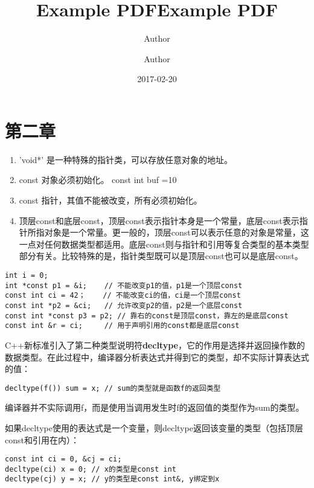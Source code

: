 \documentclass[
  a4paper,
  oneside,tablecaptionabove
]{scrbook}
\title{Example PDF}
\author{Author}
\date{2017-02-20}
\title{Example PDF}
\author{Author}
\providecommand{\tightlist}{%
  \setlength{\itemsep}{0pt}\setlength{\parskip}{0pt}}
\begin{document}





\chapter{第二章}\label{ux7b2cux4e8cux7ae0}

\begin{enumerate}
\def\labelenumi{\arabic{enumi}.}
\tightlist
\item
  'void*' 是一种特殊的指针类，可以存放任意对象的地址。\\
\item
  const 对象必须初始化。 const int buf =10\\
\item
  const 指针，其值不能被改变，所有必须初始化。
\item
  顶层const和底层const，顶层const表示指针本身是一个常量，底层const表示指针所指对象是一个常量。更一般的，顶层const可以表示任意的对象是常量，这一点对任何数据类型都适用。底层const则与指针和引用等复合类型的基本类型部分有关。比较特殊的是，指针类型既可以是顶层const也可以是底层const。
\end{enumerate}

\begin{lstlisting}
int i = 0;
int *const p1 = &i;    // 不能改变p1的值，p1是一个顶层const
const int ci = 42；    // 不能改变ci的值，ci是一个顶层const
const int *p2 = &ci;   // 允许改变p2的值，p2是一个底层const
const int *const p3 = p2; // 靠右的const是顶层const，靠左的是底层const
const int &r = ci;     // 用于声明引用的const都是底层const
\end{lstlisting}

C++新标准引入了第二种类型说明符\textbf{decltype}，它的作用是选择并返回操作数的数据类型。在此过程中，编译器分析表达式并得到它的类型，却不实际计算表达式的值：

\begin{lstlisting}
decltype(f()) sum = x; // sum的类型就是函数f的返回类型
\end{lstlisting}

编译器并不实际调用f，而是使用当调用发生时f的返回值的类型作为sum的类型。

如果decltype使用的表达式是一个变量，则decltype返回该变量的类型（包括顶层const和引用在内）：

\begin{lstlisting}
const int ci = 0, &cj = ci;
decltype(ci) x = 0; // x的类型是const int
decltype(cj) y = x; // y的类型是const int&, y绑定到x
\end{lstlisting}
\end{document}
